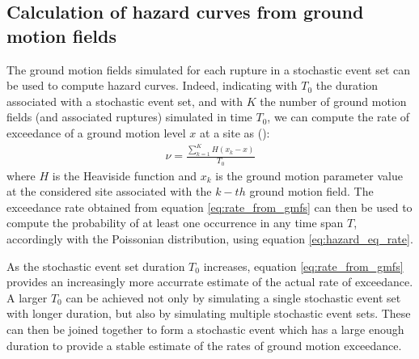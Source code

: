 \subsection{Calculation of hazard curves from ground motion fields}
The ground motion fields simulated for each rupture in a stochastic event set can be used to
compute hazard curves. Indeed, indicating with $T_{0}$ the duration associated with a stochastic
event set, and with $K$ the number of ground motion fields (and associated ruptures) simulated
in time $T_{0}$, we can compute the rate of exceedance of a ground motion level $x$ at a site as (\cite{ebel1999}):
\begin{align}
\label{eq:rate_from_gmfs}
\nu = \frac{\sum_{k=1}^{K}H(x_{k} - x)}{T_{0}}
\end{align}
where $H$ is the Heaviside function and $x_{k}$ is the ground motion parameter value at the considered site associated
with the $k-th$ ground motion field. The exceedance rate obtained from equation \ref{eq:rate_from_gmfs} can then be
used to compute the probability of at least one occurrence in any time span $T$, accordingly with the Poissonian distribution,
using equation \ref{eq:hazard_eq_rate}.

As the stochastic event set duration $T_{0}$ increases, equation \ref{eq:rate_from_gmfs}
provides an increasingly more accurrate estimate of the actual rate of exceedance. A larger $T_{0}$ can be achieved
not only by simulating a single stochastic event set with longer duration, but also by simulating multiple
stochastic event sets. These can then be joined together to form a stochastic event which has a large enough
duration to provide a stable estimate of the rates of ground motion exceedance.

